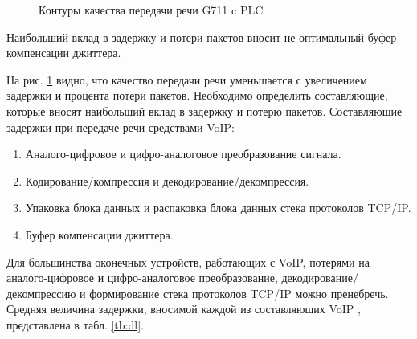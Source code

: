 \pgfplotsset{width=15cm, height=10cm, compat=1.3}
\begin{figure} [h]
  \center
{}
\caption{Контуры качества передачи речи G711 c PLC}
  \label{img1:qos_dd}
\end{figure}



Наибольший вклад в задержку и потери пакетов вносит не оптимальный буфер компенсации джиттера. 

На рис. \ref{img1:qos_dd} видно, что качество передачи
речи уменьшается с увеличением задержки и
процента потери пакетов. Необходимо определить составляющие, которые вносят
наибольший вклад в задержку и потерю пакетов.
Составляющие задержки при передаче речи средствами VoIP:
\begin{enumerate}
 \item Аналого-цифровое и цифро-аналоговое преобразование сигнала.
 \item Кодирование/компрессия и декодирование/декомпрессия.
 \item Упаковка блока данных и распаковка блока данных стека протоколов TCP/IP.
 \item Буфер компенсации джиттера.
\end{enumerate}

Для большинства оконечных устройств, работающих с VoIP, потерями на аналого-цифровое и цифро-аналоговое преобразование, 
декодирование/декомпрессию и формирование стека протоколов TCP/IP можно пренебречь. 
Средняя величина задержки, вносимой каждой из составляющих VoIP \cite{G114,Y1541}, представлена в табл. \ref{tb:dl}.


